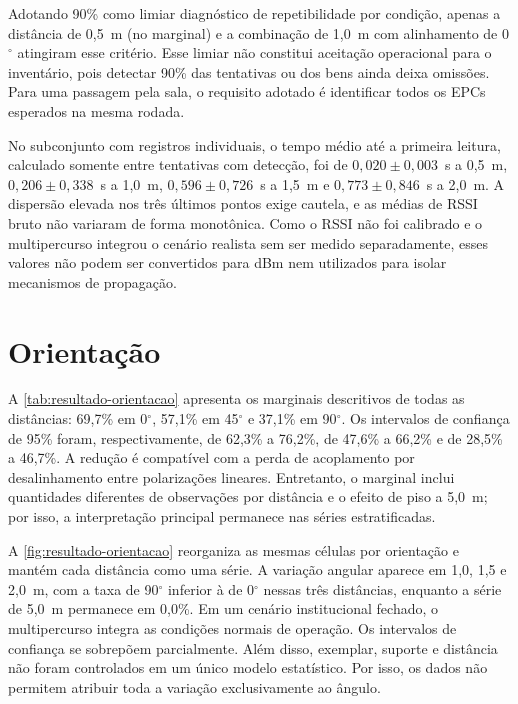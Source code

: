 Adotando 90\% como limiar diagnóstico de repetibilidade por condição, apenas a distância de 0,5~m (no marginal) e a combinação de 1,0~m com alinhamento de 0$^\circ$ atingiram esse critério. Esse limiar não constitui aceitação operacional para o inventário, pois detectar 90\% das tentativas ou dos bens ainda deixa omissões. Para uma passagem pela sala, o requisito adotado é identificar todos os EPCs esperados na mesma rodada.

No subconjunto com registros individuais, o tempo médio até a primeira leitura, calculado somente entre tentativas com detecção, foi de $0{,}020 \pm 0{,}003$~s a 0,5~m, $0{,}206 \pm 0{,}338$~s a 1,0~m, $0{,}596 \pm 0{,}726$~s a 1,5~m e $0{,}773 \pm 0{,}846$~s a 2,0~m. A dispersão elevada nos três últimos pontos exige cautela, e as médias de RSSI bruto não variaram de forma monotônica. Como o RSSI não foi calibrado e o multipercurso integrou o cenário realista sem ser medido separadamente, esses valores não podem ser convertidos para dBm nem utilizados para isolar mecanismos de propagação.

\section{Orientação}

A \autoref{tab:resultado-orientacao} apresenta os marginais descritivos de todas as distâncias: 69,7\% em 0$^\circ$, 57,1\% em 45$^\circ$ e 37,1\% em 90$^\circ$. Os intervalos de confiança de 95\% foram, respectivamente, de 62,3\% a 76,2\%, de 47,6\% a 66,2\% e de 28,5\% a 46,7\%. A redução é compatível com a perda de acoplamento por desalinhamento entre polarizações lineares. Entretanto, o marginal inclui quantidades diferentes de observações por distância e o efeito de piso a 5,0~m; por isso, a interpretação principal permanece nas séries estratificadas.

\TabelaOrientacao

A \autoref{fig:resultado-orientacao} reorganiza as mesmas células por orientação e mantém cada distância como uma série. A variação angular aparece em 1,0, 1,5 e 2,0~m, com a taxa de 90$^\circ$ inferior à de 0$^\circ$ nessas três distâncias, enquanto a série de 5,0~m permanece em 0,0\%. Em um cenário institucional fechado, o multipercurso integra as condições normais de operação. Os intervalos de confiança se sobrepõem parcialmente. Além disso, exemplar, suporte e distância não foram controlados em um único modelo estatístico. Por isso, os dados não permitem atribuir toda a variação exclusivamente ao ângulo.

